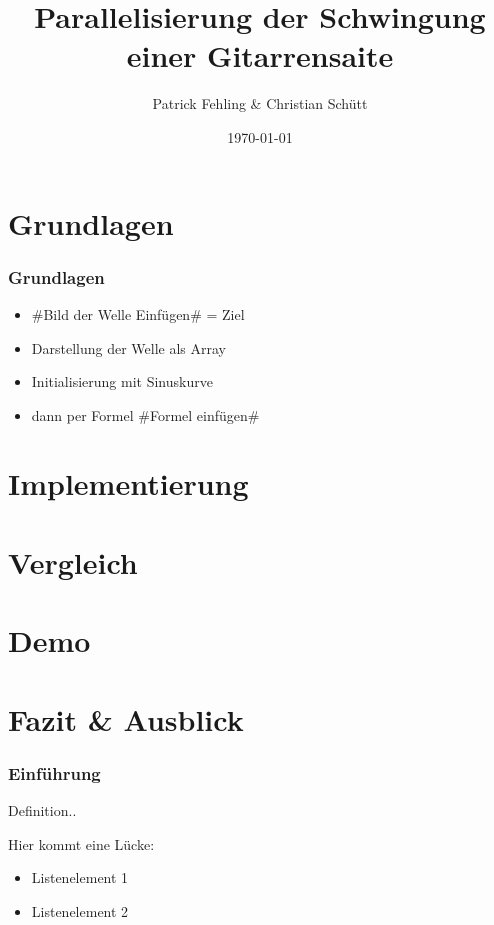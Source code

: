 \documentclass[xcolor=dvipsnames]{beamer}
\title{Parallelisierung der Schwingung einer Gitarrensaite}
\author{Patrick Fehling \& Christian Schütt}
\date{\today}
\begin{document}
\maketitle
\frame{\tableofcontents}

\section{Grundlagen}
\begin{frame}\frametitle{Grundlagen}
	\begin{itemize}
		\item \#Bild der Welle Einfügen\# = Ziel
		\item Darstellung der Welle als Array
		\item Initialisierung mit Sinuskurve
		\item dann per Formel \#Formel einfügen\#
	\end{itemize}
\end{frame}

\section{Implementierung}
\section{Vergleich}
\section{Demo}
\section{Fazit \& Ausblick}

\begin{frame}
	\frametitle{Einführung}
	\begin{Definition}
		Definition..
	\end{Definition}
	Hier kommt eine Lücke:
	\vspace{4ex}
	\begin{itemize}
		\item Listenelement 1
		\item Listenelement 2
	\end{itemize}
\end{frame}

\frame{\tableofcontents[current]}
\end{document}
